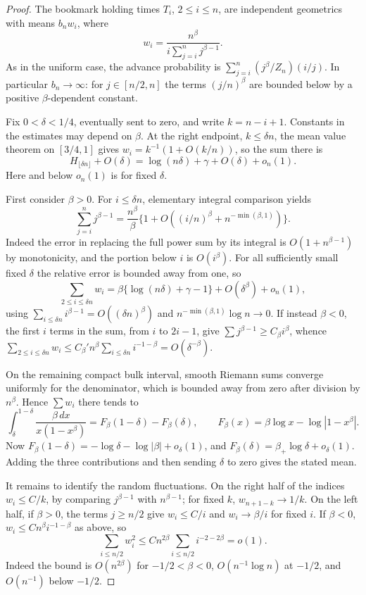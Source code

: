 \documentclass[11pt]{article}
\begin{document}
\begin{proof}
The bookmark holding times $T_i$, $2\le i\le n$, are independent geometrics with means $b_n w_i$, where
\[
 w_i=\frac{n^\beta}{i\sum_{j=i}^n j^{\beta-1}}.
\]
As in the uniform case, the advance probability is $\sum_{j=i}^n(j^\beta/Z_n)(i/j)$. In particular $b_n\to\infty$: for $j\in[n/2,n]$ the terms $(j/n)^\beta$ are bounded below by a positive $\beta$-dependent constant.

Fix $0<\delta<1/4$, eventually sent to zero, and write $k=n-i+1$. Constants in the estimates may depend on $\beta$. At the right endpoint, $k\le\delta n$, the mean value theorem on $[3/4,1]$ gives
$w_i=k^{-1}(1+O(k/n))$, so the sum there is
\[
 H_{\lfloor\delta n\rfloor}+O(\delta)=\log(n\delta)+\gamma+O(\delta)+o_n(1).
\]
Here and below $o_n(1)$ is for fixed $\delta$.

First consider $\beta>0$. For $i\le\delta n$, elementary integral comparison yields
\[
 \sum_{j=i}^n j^{\beta-1}=
 \frac{n^\beta}{\beta}
 \{1+O((i/n)^\beta+n^{-\min(\beta,1)})\}.
\]
Indeed the error in replacing the full power sum by its integral is $O(1+n^{\beta-1})$ by monotonicity, and the portion below $i$ is $O(i^\beta)$. For all sufficiently small fixed $\delta$ the relative error is bounded away from one, so
\[
 \sum_{2\le i\le\delta n} w_i
 =\beta\{\log(n\delta)+\gamma-1\}+O(\delta^\beta)+o_n(1),
\]
using $\sum_{i\le\delta n}i^{\beta-1}=O((\delta n)^\beta)$ and $n^{-\min(\beta,1)}\log n\to0$.
If instead $\beta<0$, the first $i$ terms in the sum, from $i$ to $2i-1$, give $\sum j^{\beta-1}\ge C_\beta i^\beta$, whence
$\sum_{2\le i\le\delta n}w_i\le C_\beta' n^\beta\sum_{i\le\delta n}i^{-1-\beta}=O(\delta^{-\beta})$.

On the remaining compact bulk interval, smooth Riemann sums converge uniformly for the denominator, which is bounded away from zero after division by $n^\beta$. Hence $\sum w_i$ there tends to
\[
 \int_\delta^{1-\delta}\frac{\beta\,dx}{x(1-x^\beta)}
 =F_\beta(1-\delta)-F_\beta(\delta),\qquad
 F_\beta(x)=\beta\log x-\log|1-x^\beta|.
\]
Now $F_\beta(1-\delta)=-\log\delta-\log|\beta|+o_\delta(1)$, and $F_\beta(\delta)=\beta_+\log\delta+o_\delta(1)$. Adding the three contributions and then sending $\delta$ to zero gives the stated mean.

It remains to identify the random fluctuations. On the right half of the indices $w_i\le C/k$, by comparing $j^{\beta-1}$ with $n^{\beta-1}$; for fixed $k$, $w_{n+1-k}\to1/k$. On the left half, if $\beta>0$, the terms $j\ge n/2$ give $w_i\le C/i$ and $w_i\to\beta/i$ for fixed $i$. If $\beta<0$, $w_i\le C n^\beta i^{-1-\beta}$ as above, so
\[
 \sum_{i\le n/2}w_i^2
 \le C n^{2\beta}\sum_{i\le n/2} i^{-2-2\beta}=o(1).
\]
Indeed the bound is $O(n^{2\beta})$ for $-1/2<\beta<0$, $O(n^{-1}\log n)$ at $-1/2$, and $O(n^{-1})$ below $-1/2$.


\end{proof}
\end{document}
